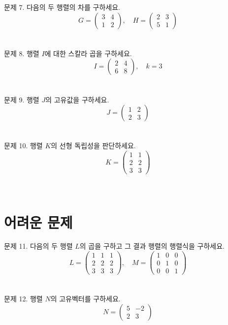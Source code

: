 \documentclass[fleqn]{article}
\begin{document}
\noindent 문제 7. 다음의 두 행렬의 차를 구하세요. $$G = \begin{pmatrix} 3 & 4 \\ 1 & 2 \end{pmatrix}, \quad H = \begin{pmatrix} 2 & 3 \\ 5 & 1 \end{pmatrix}$$ \\\\

\noindent 문제 8. 행렬 $I$에 대한 스칼라 곱을 구하세요. $$I = \begin{pmatrix} 2 & 4 \\ 6 & 8 \end{pmatrix}, \quad k = 3$$ \\\\

\noindent 문제 9. 행렬 $J$의 고유값을 구하세요. $$J = \begin{pmatrix} 1 & 2 \\ 2 & 3 \end{pmatrix}$$ \\\\

\noindent 문제 10. 행렬 $K$의 선형 독립성을 판단하세요. $$K = \begin{pmatrix} 1 & 1 \\ 2 & 2 \\ 3 & 3 \end{pmatrix}$$ \\\\

\section*{어려운 문제}

\noindent 문제 11. 다음의 두 행렬 $L$의 곱을 구하고 그 결과 행렬의 행렬식을 구하세요. $$L = \begin{pmatrix} 1 & 1 & 1 \\ 2 & 2 & 2 \\ 3 & 3 & 3 \end{pmatrix}, \quad M = \begin{pmatrix} 1 & 0 & 0 \\ 0 & 1 & 0 \\ 0 & 0 & 1 \end{pmatrix}$$ \\\\

\noindent 문제 12. 행렬 $N$의 고유벡터를 구하세요. $$N = \begin{pmatrix} 5 & -2 \\ 2 & 3 \end{pmatrix}$$ \\\\
\end{document}

